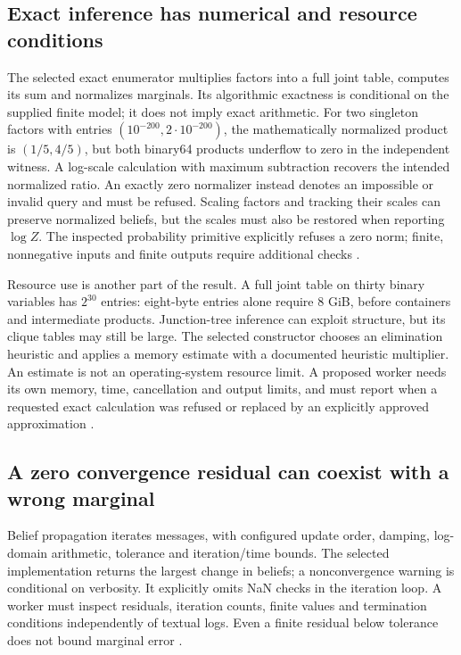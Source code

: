 \subsection{Exact inference has numerical and resource conditions}
The selected exact enumerator multiplies factors into a full joint table,
computes its sum and normalizes marginals. Its algorithmic exactness is
conditional on the supplied finite model; it does not imply exact arithmetic.
For two singleton factors with entries $(10^{-200},2\cdot10^{-200})$, the
mathematically normalized product is $(1/5,4/5)$, but both binary64 products
underflow to zero in the independent witness. A log-scale calculation with
maximum subtraction recovers the intended normalized ratio. An exactly zero
normalizer instead denotes an impossible or invalid query and must be
refused. Scaling factors and tracking their scales can preserve normalized
beliefs, but the scales must also be restored when reporting $\log Z$.
The inspected probability primitive explicitly refuses a zero norm;
finite, nonnegative inputs and finite outputs require additional checks
\citep{exec24_libdai_source,exec24_libdai_choice}.

Resource use is another part of the result. A full joint table on thirty
binary variables has $2^{30}$ entries: eight-byte entries alone require
8 GiB, before containers and intermediate products. Junction-tree inference
can exploit structure, but its clique tables may still be large. The
selected constructor chooses an elimination heuristic and applies a memory
estimate with a documented heuristic multiplier. An estimate is not an
operating-system resource limit. A proposed worker needs its own memory,
time, cancellation and output limits, and must report when a requested
exact calculation was refused or replaced by an explicitly approved
approximation \citep{exec24_libdai_source,exec24_libdai_choice}.

\subsection{A zero convergence residual can coexist with a wrong marginal}
Belief propagation iterates messages, with configured update order, damping,
log-domain arithmetic, tolerance and iteration/time bounds. The selected
implementation returns the largest change in beliefs; a nonconvergence
warning is conditional on verbosity. It explicitly omits NaN checks in the
iteration loop. A worker must inspect residuals, iteration counts, finite
values and termination conditions independently of textual logs. Even a
finite residual below tolerance does not bound marginal error
\citep{exec24_libdai_source}.

